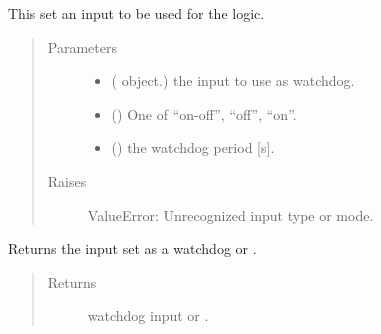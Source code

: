 \documentclass[letterpaper,10pt,english]{sphinxmanual}
\begin{document}
\begin{fulllineitems}
\label{\detokenize{fsm:setWatchdogInput}}
This set an input to be used for the {\hyperref[\detokenize{watchdog:watchdog}]{}} logic.
\begin{quote}\begin{description}
\item[{Parameters}] \leavevmode\begin{itemize}
\item {} 
 ({\hyperref[\detokenize{io:fsmIO}]{}} object.) \textendash{} the input to use as watchdog.

\item {} 
 () \textendash{} One of “on-off”, “off”, “on”.

\item {} 
 () \textendash{} the watchdog period {[}s{]}.

\end{itemize}

\item[{Raises}] \leavevmode
ValueError: Unrecognized input type or mode.

\end{description}\end{quote}

\end{fulllineitems}


\begin{fulllineitems}
\label{\detokenize{fsm:getWatchdogInput}}
Returns the input set as a watchdog or .
\begin{quote}\begin{description}
\item[{Returns}] \leavevmode
watchdog input or .

\end{description}\end{quote}

\end{fulllineitems}
\end{document}

